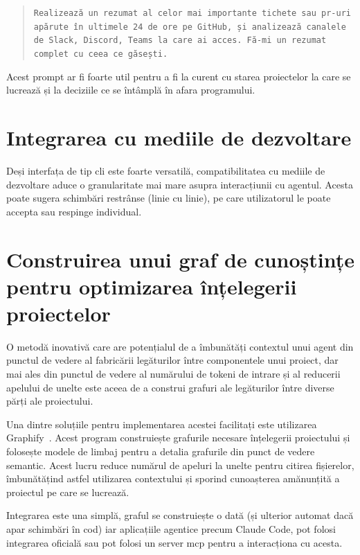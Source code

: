 \documentclass[12pt, a4paper, oneside, romanian]{teza-upb}
\begin{document}
  \begin{quote}
  \texttt{Realizează un rezumat al celor mai importante tichete sau \ac{pr}-uri apărute în ultimele 24 de ore pe GitHub, și analizează canalele de Slack, Discord, Teams la care ai acces. Fă-mi un rezumat complet cu ceea ce găsești.}
  \end{quote}

  Acest prompt ar fi foarte util pentru a fi la curent cu starea proiectelor la care se lucrează și la deciziile ce se întâmplă în afara programului.

  \section{Integrarea cu mediile de dezvoltare}

  Deși interfața de tip \ac{cli} este foarte versatilă, compatibilitatea cu mediile de dezvoltare aduce o granularitate mai mare asupra interacțiunii cu agentul.
  Acesta poate sugera schimbări restrânse (linie cu linie), pe care utilizatorul le poate accepta sau respinge individual.

  \section{Construirea unui graf de cunoștințe pentru optimizarea înțelegerii proiectelor}

  O metodă inovativă care are potențialul de a îmbunătăți contextul unui agent din punctul de vedere al fabricării legăturilor între componentele unui proiect, dar
  mai ales din punctul de vedere al numărului de tokeni de intrare și al reducerii apelului de unelte este aceea de a construi grafuri ale legăturilor între diverse părți
  ale proiectului.

  Una dintre soluțiile pentru implementarea acestei facilitați este utilizarea Graphify~\cite{web_graphify}. Acest program construiește grafurile necesare înțelegerii proiectului și folosește
  modele de limbaj pentru a detalia grafurile din punct de vedere semantic. Acest lucru reduce numărul de apeluri la unelte pentru citirea fișierelor, îmbunătățind astfel utilizarea contextului
  și sporind cunoașterea amănunțită a proiectul pe care se lucrează.

  Integrarea este una simplă, graful se construiește o dată (și ulterior automat dacă apar schimbări în cod) iar aplicațiile agentice precum Claude Code, pot folosi integrarea oficială sau pot folosi un server \ac{mcp} pentru a interacționa cu acesta.
\end{document}
